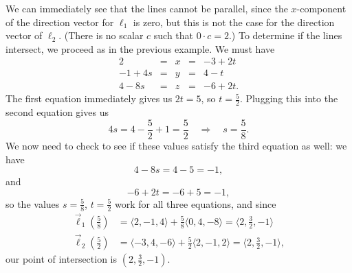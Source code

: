 
{We can immediately see that the lines cannot be parallel, since the $x$-component of the direction vector for $\ell_1$ is zero, but this is not the case for the direction vector of $\ell_2$. (There is no scalar $c$ such that $0\cdot c=2$.) To determine if the lines intersect, we proceed as in the previous example. We must have
\[
\begin{array}{ccccc}
2 & = & x & = &-3+2t\\
-1+4s & = &  y & = & 4-t\\
4-8s & = & z & = & -6+2t.
\end{array}
\]
The first equation immediately gives us $2t=5$, so $t=\frac{5}{2}$. Plugging this into the second equation gives us
\[
4s = 4-\frac{5}{2}+1 = \frac{5}{2} \quad \Rightarrow \quad s=\frac{5}{8}.
\]
We now need to check to see if these values satisfy the third equation as well: we have
\[
4-8s = 4-5=-1,
\]
and
\[
-6+2t = -6+5=-1,
\]
so the values $s=\frac{5}{8}$, $t=\frac{5}{2}$ work for all three equations, and since
\begin{align*}
\vec\ell_1\left(\frac{5}{8}\right) &= \langle 2, -1, 4\rangle +\frac{5}{8}\langle 0, 4, -8\rangle = \langle 2, \frac{3}{2}, -1\rangle \tag*{and}\\
\vec\ell_2\left(\frac{5}{2}\right) & = \langle -3, 4, -6\rangle+\frac{5}{2}\langle 2, -1, 2\rangle = \langle 2, \frac{3}{2}, -1\rangle,
\end{align*}
our point of intersection is $(2, \frac{3}{2}, -1)$.
}\\


